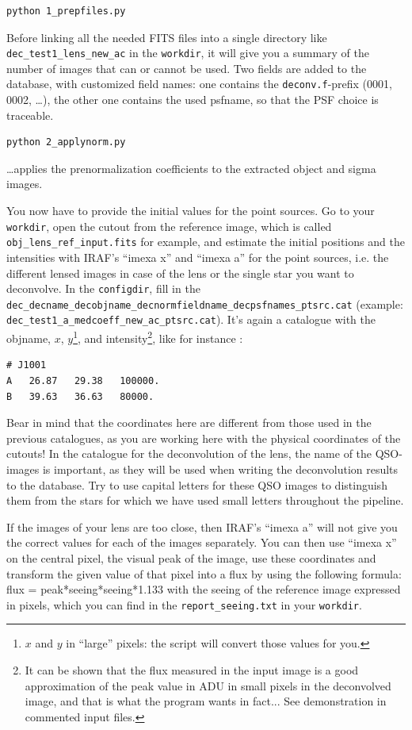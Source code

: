 \begin{Verbatim}
python 1_prepfiles.py
\end{Verbatim}
Before linking all the needed FITS files into a single directory like \verb+dec_test1_lens_new_ac+ in the \verb+workdir+, it will give you a summary of the number of images that can or cannot be used. Two fields are added to the database, with customized field names: one contains the \verb+deconv.f+-prefix (0001, 0002, \ldots), the other one contains the used psfname, so that the PSF choice is traceable.


\begin{Verbatim}
python 2_applynorm.py
\end{Verbatim}
\ldots applies the prenormalization coefficients to the extracted object and sigma images.

You now have to provide the initial values for the point sources. Go to your \verb+workdir+, open the cutout from the reference image, which is called \verb+obj_lens_ref_input.fits+ for example, and estimate the initial positions and the intensities with IRAF's ``imexa x'' and ``imexa a'' for the point sources, i.e. the different lensed images in case of the lens or the single star you want to deconvolve. In the \verb+configdir+, fill in the \verb+dec_decname_decobjname_decnormfieldname_decpsfnames_ptsrc.cat+ (example: \verb+dec_test1_a_medcoeff_new_ac_ptsrc.cat+). It's again a catalogue with the objname, $x$, $y$\footnote{$x$ and $y$ in ``large'' pixels: the script will convert those values for you.}, and intensity\footnote{It can be shown that the flux measured in the input image is a good approximation of the peak value in ADU in small pixels in the deconvolved image, and that is what the program wants in fact... See demonstration in commented input files.}, like for instance :

\begin{Verbatim}[fontsize=\relsize{-2}]
# J1001
A	26.87	29.38	100000.
B	39.63	36.63	80000.
\end{Verbatim}
Bear in mind that the coordinates here are different from those used in the previous catalogues, as you are working here with the physical coordinates of the cutouts! In the catalogue for the deconvolution of the lens, the name of the QSO-images is important, as they will be used when writing the deconvolution results to the database. Try to use capital letters for these QSO images to distinguish them from the stars for which we have used small letters throughout the pipeline.

If the images of your lens are too close, then IRAF's ``imexa a'' will not give you the correct values for each of the images separately. You can then use ``imexa x'' on the central pixel, the visual peak of the image, use these coordinates and transform the given value of that pixel into a flux by using the following formula: flux = peak*seeing*seeing*1.133 with the seeing of the reference image expressed in pixels, which you can find in the \verb+report_seeing.txt+ in your \verb+workdir+.


